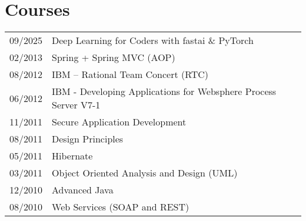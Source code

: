 \documentclass[2pt,a4paper]{article}
\newlength{\datecolumn}
\newlength{\textcolumn}
\begin{document}
\section*{Courses}
\begin{tabular}{p{\datecolumn} p{\textcolumn}}
09/2025 & Deep Learning for Coders with fastai \& PyTorch \\
02/2013 & Spring + Spring MVC (AOP) \\
08/2012 & IBM – Rational Team Concert (RTC) \\
06/2012 & IBM - Developing Applications for Websphere Process Server V7-1 \\
11/2011 & Secure Application Development \\
08/2011 & Design Principles \\
05/2011 & Hibernate \\
03/2011 & Object Oriented Analysis and Design (UML) \\
12/2010 & Advanced Java \\
08/2010 & Web Services (SOAP and REST) \\
\end{tabular}
\end{document}
